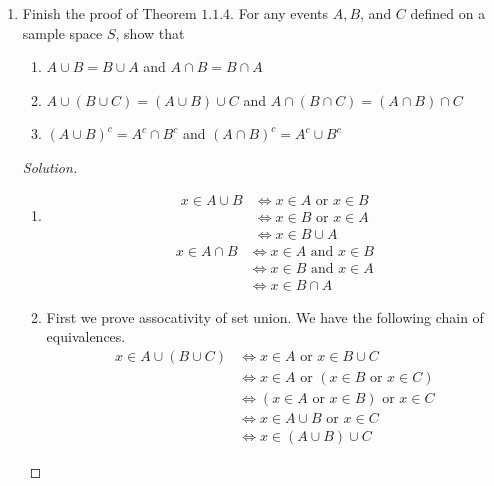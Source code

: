 \documentclass[12pt]{article}
\theoremstyle{definition}
\theoremstyle{plain}
\newenvironment{solution}
  {\begin{proof}[Solution]}
  {\end{proof}}
\newcommand{\Or}{\text{ or }}
\renewcommand{\And}{\text{ and }}
\begin{document}
\begin{enumerate}
\begin{solution}
\begin{enumerate}
	\item \begin{align*}
		x \in A \cup B &\iff x \in A \Or x\in B\\
		&\iff (x \in A \Or x \in B) \And \text{true}\\
		&\iff (x \in A \Or x \in B) \And (x \in A \Or x \notin A)\\
		&\iff x \in A \Or (x \in B \And x \notin A)\\
		&\iff x \in A \Or (x \in B \And x \in A^c)\\
		&\iff x \in A \Or x \in B \cap A^c\\
		&\iff x \in A \cup (B \cap A^c)
	\end{align*}
	\end{enumerate}
	\end{solution}
	
\item Finish the proof of Theorem $ 1.1.4 $. For any events $ A, B $, and $ C $ defined on a sample space $ S $, show that 
	\begin{enumerate}
	\item $ A \cup B = B \cup A $ and $ A \cap B = B \cap A $
	\item $ A \cup (B \cup C) = (A \cup B) \cup C $ and $ A \cap (B \cap C) = (A \cap B) \cap C $
	\item $ (A \cup B)^c = A^c \cap B^c $ and $ (A \cap B)^c = A^c \cup B^c $
	\end{enumerate}
	\begin{solution}
	\begin{enumerate}
	\item \begin{align*}
			x \in A \cup B &\iff x \in A  \Or  x \in B \\
			& \iff x \in B \Or x \in A\\
			& \iff x \in B \cup A
		\end{align*}
		\begin{align*}
			x \in A \cap B &\iff x \in A  \And  x \in B \\
			& \iff x \in B \And x \in A\\
			& \iff x \in B \cap A
		\end{align*}
		
	\item First we prove assocativity of set union. We have the following chain of equivalences.
		\begin{align*}
			x \in A \cup (B \cup C) &\iff x \in A  \Or  x \in B \cup C \\
			& \iff x \in A \Or (x \in B \Or x \in C)\\
			& \iff (x \in A \Or x \in B ) \Or x \in C\\
			& \iff x \in A \cup B \Or x \in C\\
			& \iff x \in (A \cup B) \cup C
		\end{align*}
		

\end{enumerate}
\end{solution}
\end{enumerate}
\end{document}
